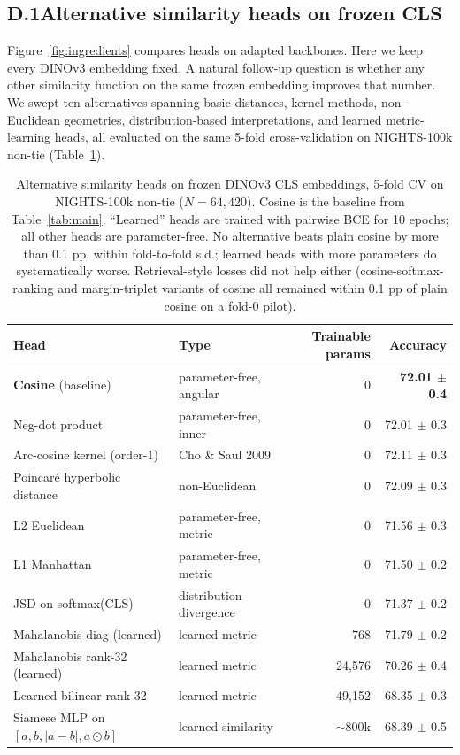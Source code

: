 \subsection*{D.1\quad Alternative similarity heads on frozen CLS}

Figure~\ref{fig:ingredients} compares heads on adapted backbones. Here we keep every DINOv3 embedding fixed. A natural follow-up question is whether any other similarity function on the same frozen embedding improves that number. We swept ten alternatives spanning basic distances, kernel methods, non-Euclidean geometries, distribution-based interpretations, and learned metric-learning heads, all evaluated on the same 5-fold cross-validation on NIGHTS-100k non-tie (Table~\ref{tab:head-sweep}).

\begin{table}[!ht]
\caption{Alternative similarity heads on frozen DINOv3 CLS embeddings, 5-fold CV on NIGHTS-100k non-tie ($N=64{,}420$). Cosine is the baseline from Table~\ref{tab:main}. ``Learned'' heads are trained with pairwise BCE for 10 epochs; all other heads are parameter-free. No alternative beats plain cosine by more than 0.1 pp, within fold-to-fold s.d.; learned heads with more parameters do systematically worse. Retrieval-style losses did not help either (cosine-softmax-ranking and margin-triplet variants of cosine all remained within 0.1 pp of plain cosine on a fold-0 pilot).}
\label{tab:head-sweep}
\centering
\small
\begin{tabular}{llrr}
\toprule
Head & Type & Trainable params & Accuracy \\
\midrule
\textbf{Cosine} (baseline)                & parameter-free, angular & 0        & \textbf{72.01 $\pm$ 0.4} \\
Neg-dot product                           & parameter-free, inner   & 0        & 72.01 $\pm$ 0.3 \\
Arc-cosine kernel (order-1)               & Cho \& Saul 2009        & 0        & 72.11 $\pm$ 0.3 \\
Poincar\'e hyperbolic distance            & non-Euclidean           & 0        & 72.09 $\pm$ 0.3 \\
L2 Euclidean                              & parameter-free, metric  & 0        & 71.56 $\pm$ 0.3 \\
L1 Manhattan                              & parameter-free, metric  & 0        & 71.50 $\pm$ 0.2 \\
JSD on softmax(CLS)                       & distribution divergence & 0        & 71.37 $\pm$ 0.2 \\
\midrule
Mahalanobis diag (learned)                & learned metric          & 768      & 71.79 $\pm$ 0.2 \\
Mahalanobis rank-32 (learned)             & learned metric          & 24{,}576 & 70.26 $\pm$ 0.4 \\
Learned bilinear rank-32                  & learned metric          & 49{,}152 & 68.35 $\pm$ 0.3 \\
Siamese MLP on $[a, b, |a{-}b|, a{\odot}b]$ & learned similarity    & $\sim$800k & 68.39 $\pm$ 0.5 \\
\bottomrule
\end{tabular}
\end{table}


